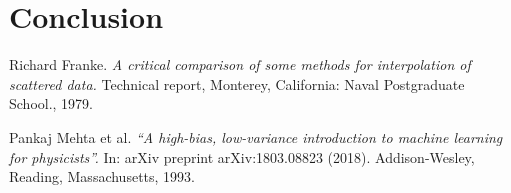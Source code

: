\documentclass[10pt]{article}
\begin{document}
\section{Conclusion}\label{Conclusion}


\begin{thebibliography}{9}
	Richard Franke. 
	\textit{A critical comparison of some methods for interpolation of scattered data. }
	Technical report, Monterey, California: Naval Postgraduate School., 1979.
	
	Pankaj Mehta et al. 
	\textit{ “A high-bias, low-variance introduction to machine learning for physicists”.}
	 In: arXiv preprint arXiv:1803.08823 (2018). Addison-Wesley, Reading, Massachusetts, 1993.


\end{thebibliography}
\end{document}
